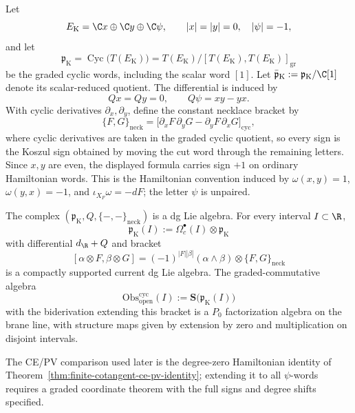 \documentclass[11pt]{memoir}
\begin{document}
\begin{defn}
\label{def:hamiltonian-cyclic-koszul-lie-model}
  Let
  \[
    E_{\mathrm K}=\C x\oplus\C y\oplus\C\psi,\qquad
    |x|=|y|=0,\quad |\psi|=-1,
  \]
  and let
	  \[
	    \mathfrak p_{\mathrm K}
	      =\operatorname{Cyc}\bigl(T(E_{\mathrm K})\bigr)
	      =T(E_{\mathrm K})/[T(E_{\mathrm K}),T(E_{\mathrm K})]_{\mathrm{gr}}
	  \]
	  be the graded cyclic words, including the scalar word \([1]\).  Let
	  \(\bar{\mathfrak p}_{\mathrm K}:=\mathfrak p_{\mathrm K}/\C[1]\)
	  denote its scalar-reduced quotient.  The differential is induced by
  \[
    Qx=Qy=0,\qquad Q\psi=xy-yx.
  \]
  With cyclic derivatives \(\partial_x,\partial_y\), define the constant
  necklace bracket by
  \[
    \{F,G\}_{\mathrm{neck}}
      =
      \bigl[\partial_xF\,\partial_yG-\partial_yF\,\partial_xG
      \bigr]_{\mathrm{cyc}},
  \]
  where cyclic derivatives are taken in the graded cyclic quotient, so
  every sign is the Koszul sign obtained by moving the cut word through
  the remaining letters.  Since \(x,y\) are even, the displayed formula
  carries sign \(+1\) on ordinary Hamiltonian words.  This is the
  Hamiltonian convention induced by
  \(\omega(x,y)=1\), \(\omega(y,x)=-1\), and
  \(\iota_{X_F}\omega=-dF\); the letter \(\psi\) is unpaired.
\end{defn}

\begin{thm}
\label{thm:primitive-cyclic-koszul-p0-model}
  The complex
  \((\mathfrak p_{\mathrm K},Q,\{-,-\}_{\mathrm{neck}})\) is a dg Lie
  algebra.  For every interval \(I\subset\R\),
  \[
    \mathfrak p_{\mathrm K}(I)
      :=\Omega_c^\bullet(I)\otimes\mathfrak p_{\mathrm K}
  \]
  with differential \(d_{\R}+Q\) and bracket
  \[
    [\alpha\otimes F,\beta\otimes G]
      =(-1)^{|F||\beta|}(\alpha\wedge\beta)\otimes
        \{F,G\}_{\mathrm{neck}}
  \]
  is a compactly supported current dg Lie algebra.  The graded-commutative
  algebra
  \[
    \mathrm{Obs}^{\mathrm{cyc}}_{\mathrm{open}}(I)
      :=\mathbf S\bigl(\mathfrak p_{\mathrm K}(I)\bigr)
  \]
  with the biderivation extending this bracket is a \(P_0\)
  factorization algebra on the brane line, with structure maps given by
  extension by zero and multiplication on disjoint intervals.

  The CE/PV comparison used later is the degree-zero Hamiltonian
  identity of Theorem~\ref{thm:finite-cotangent-ce-pv-identity};
  extending it to all \(\psi\)-words requires a graded coordinate
  theorem with the full signs and degree shifts specified.
\end{thm}
\end{document}
